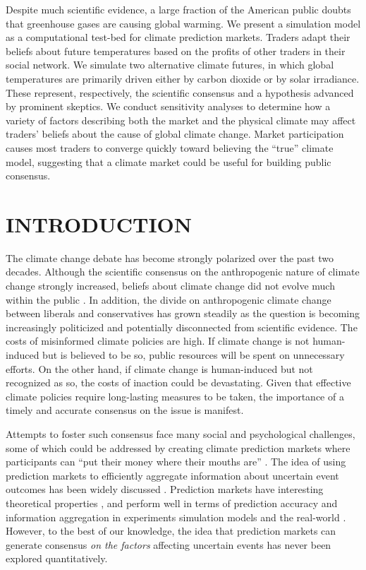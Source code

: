 \documentclass{wscpaperproc}\usepackage[]{graphicx}\usepackage[]{color}
\begin{document}
Despite much scientific evidence, a large fraction of the American public doubts that greenhouse gases are causing global warming. We present a simulation model as a computational test-bed for climate prediction markets. Traders adapt their beliefs about future temperatures based on the profits of other traders in their social network. We simulate two alternative climate futures, in which global temperatures are primarily driven either by carbon dioxide or by solar irradiance. These represent, respectively, the scientific consensus and a hypothesis advanced by prominent skeptics. We conduct sensitivity analyses to determine how a variety of factors describing both the market and the physical climate may affect traders' beliefs about the cause of global climate change. Market participation causes most traders to converge quickly toward believing the ``true'' climate model, suggesting that a climate market could be useful for building public consensus.

\section{INTRODUCTION}

The climate change debate has become strongly polarized over the past two decades. Although the scientific consensus on the anthropogenic nature of climate change strongly increased, beliefs about climate change did not evolve much within the public . In addition, the divide on anthropogenic climate change between liberals and conservatives has grown steadily as the question is becoming increasingly politicized and potentially disconnected from scientific evidence. The costs of misinformed climate policies are high. If climate change is not human-induced but is believed to be so, public resources will be spent on unnecessary efforts. On the other hand, if climate change is human-induced but not recognized as so, the costs of inaction could be devastating. Given that effective climate policies require long-lasting measures to be taken, the importance of a timely and accurate consensus on the issue is manifest.

Attempts to foster such consensus face many social and psychological challenges, some of which could be addressed by creating climate prediction markets where participants can ``put their money where their mouths are'' . The idea of using prediction markets to efficiently aggregate information about uncertain event outcomes has been widely discussed . Prediction markets have interesting theoretical properties , and perform well in terms of prediction accuracy and information aggregation in experiments  simulation models  and the real-world . However, to the best of our knowledge, the idea that prediction markets can generate consensus \emph{on the factors\/} affecting uncertain events has never been explored quantitatively.
\end{document}
